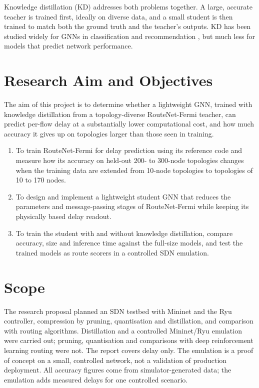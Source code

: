 Knowledge distillation (KD) \cite{hinton2015distilling} addresses both problems together. A large, accurate teacher is trained first, ideally on diverse data, and a small student is then trained to match both the ground truth and the teacher's outputs. KD has been studied widely for GNNs in classification and recommendation \cite{yang2020lsp,zhang2022glnn,chen2021gnnsd,yang2023ltd,huo2023t2gnn,chen2025lightgnn}, but much less for models that predict network performance.

\section{Research Aim and Objectives}
\label{sec:objectives}

The aim of this project is to determine whether a lightweight GNN, trained with knowledge distillation from a topology-diverse RouteNet-Fermi teacher, can predict per-flow delay at a substantially lower computational cost, and how much accuracy it gives up on topologies larger than those seen in training.

\begin{enumerate}[label=\textbf{O\arabic*.}, leftmargin=*]
  \item To train RouteNet-Fermi for delay prediction using its reference code and measure how its accuracy on held-out 200- to 300-node topologies changes when the training data are extended from 10-node topologies to topologies of 10 to 170 nodes.
  \item To design and implement a lightweight student GNN that reduces the parameters and message-passing stages of RouteNet-Fermi while keeping its physically based delay readout.
  \item To train the student with and without knowledge distillation, compare accuracy, size and inference time against the full-size models, and test the trained models as route scorers in a controlled SDN emulation.
\end{enumerate}

\section{Scope}
\label{sec:scope}

The research proposal \cite{proposal2025} planned an SDN testbed with Mininet and the Ryu controller, compression by pruning, quantisation and distillation, and comparison with routing algorithms. Distillation and a controlled Mininet/Ryu emulation were carried out; pruning, quantisation and comparisons with deep reinforcement learning routing were not. The report covers delay only. The emulation is a proof of concept on a small, controlled network, not a validation of production deployment. All accuracy figures come from simulator-generated data; the emulation adds measured delays for one controlled scenario.

